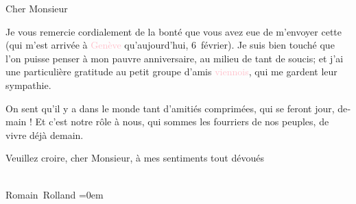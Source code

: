 \pstart{}\begin{otherlanguage}{french}Cher Monsieur\end{otherlanguage}\pend\vspace{0.5em}
\pstart
           \begin{otherlanguage}{french}Je vous remercie cordialement de la bonté que vous avez eue de
                  m’envoyer cette \label{K_L03883-2v}\label{K_L03883-2} (qui m’est arrivée à \textcolor{pink}{Genève}\ledrightnote{\textcolor{pink}{Genf}} qu’aujourd’hui, 6 février). Je suis bien touché que
                  l’on puisse penser à mon pauvre anniversaire, au milieu de tant de soucis; et j’ai
                  une particulière gratitude au petit groupe d’amis \textcolor{pink}{viennois}\ledrightnote{\textcolor{pink}{Wien}}, qui me gardent leur sympathie.\end{otherlanguage}\pend
           
\pstart
           \begin{otherlanguage}{french}On sent qu’il y a dans {\pb}le monde tant d’amitiés comprimées, qui
                  se feront jour, demain ! Et c’est notre rôle à nous, qui  sommes les fourriers de nos peuples, de vivre déjà
                  demain.\end{otherlanguage}\pend
           
\pstart
           \begin{otherlanguage}{french}Veuillez croire, cher Monsieur, à mes sentiments tout
                  dévoués\end{otherlanguage}{\\[\baselineskip]}\spacefill\mbox{Romain Rolland}\pend
           \leftskip=0em{}\endnumbering{}
\begin{anhang}
\end{anhang}
      
